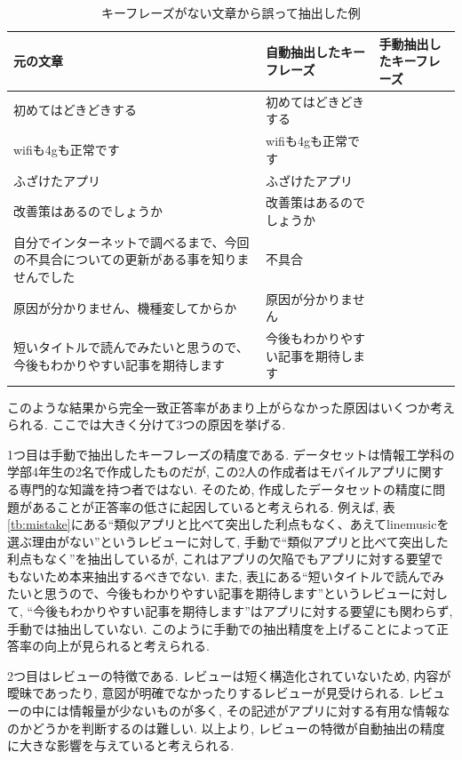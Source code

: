 \begin{table}[H]
  \caption{ キーフレーズがない文章から誤って抽出した例 }
  \label{tb:mistake2}
  \begin{center}
  \begin{tabularx}{\linewidth}{X|X|X}
    \hline
    元の文章&自動抽出したキーフレーズ&手動抽出したキーフレーズ\\\hline\hline
    初めてはどきどきする&初めてはどきどきする&\\\hline
    wifiも4gも正常です&wifiも4gも正常です&\\\hline
    ふざけたアプリ&ふざけたアプリ&\\\hline
    改善策はあるのでしょうか&改善策はあるのでしょうか&\\\hline
    自分でインターネットで調べるまで、今回の不具合についての更新がある事を知りませんでした&不具合&\\\hline
    原因が分かりません、機種変してからか&原因が分かりません&\\\hline
    短いタイトルで読んでみたいと思うので、今後もわかりやすい記事を期待します&今後もわかりやすい記事を期待します&\\\hline
  \end{tabularx}\end{center}
\end{table}

このような結果から完全一致正答率があまり上がらなかった原因はいくつか考えられる. ここでは大きく分けて3つの原因を挙げる. 

1つ目は手動で抽出したキーフレーズの精度である. データセットは情報工学科の学部4年生の2名で作成したものだが, この2人の作成者はモバイルアプリに関する専門的な知識を持つ者ではない. そのため, 作成したデータセットの精度に問題があることが正答率の低さに起因していると考えられる. 
例えば, 表\ref{tb:mistake}にある``類似アプリと比べて突出した利点もなく、あえてlinemusicを選ぶ理由がない''というレビューに対して, 手動で``類似アプリと比べて突出した利点もなく''を抽出しているが, これはアプリの欠陥でもアプリに対する要望でもないため本来抽出するべきでない. 
また, 表\ref{tb:mistake2}にある``短いタイトルで読んでみたいと思うので、今後もわかりやすい記事を期待します''というレビューに対して, ``今後もわかりやすい記事を期待します''はアプリに対する要望にも関わらず, 手動では抽出していない. このように手動での抽出精度を上げることによって正答率の向上が見られると考えられる. 

2つ目はレビューの特徴である. レビューは短く構造化されていないため, 内容が曖昧であったり, 意図が明確でなかったりするレビューが見受けられる. レビューの中には情報量が少ないものが多く, その記述がアプリに対する有用な情報なのかどうかを判断するのは難しい. 
以上より, レビューの特徴が自動抽出の精度に大きな影響を与えていると考えられる. 

